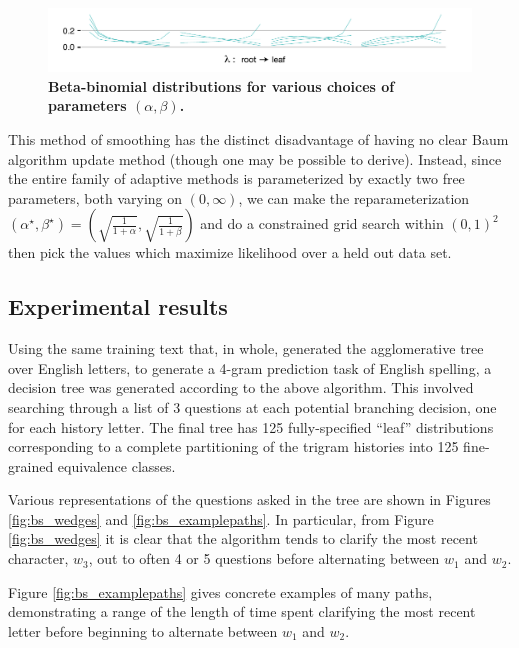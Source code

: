 \documentclass[12pt]{article}
\begin{document}
\begin{figure}
  \centering
  \includegraphics[width=\linewidth]{betabinom}
  \caption{\textbf{Beta-binomial distributions for various choices of
      parameters $(\alpha, \beta)$.}}
  \label{fig:betabinomial}
\end{figure}

This method of smoothing has the distinct disadvantage of having no
clear Baum algorithm update method (though one may be possible to
derive). Instead, since the entire family of adaptive methods is
parameterized by exactly two free parameters, both varying on $(0,
\infty)$, we can make the reparameterization $(\alpha^\star,
\beta^\star) = \left(\sqrt{\frac{1}{1+\alpha}},
  \sqrt{\frac{1}{1+\beta}}\right)$ and do a constrained grid search
within $(0,1)^2$ then pick the values which maximize likelihood over a
held out data set.

\subsection{Experimental results}

Using the same training text that, in whole, generated the
agglomerative tree over English letters, to generate a 4-gram
prediction task of English spelling, a decision tree was generated
according to the above algorithm. This involved searching through a
list of 3 questions at each potential branching decision, one for each
history letter. The final tree has 125 fully-specified ``leaf''
distributions corresponding to a complete partitioning of the trigram
histories into 125 fine-grained equivalence classes.

Various representations of the questions asked in the tree are shown
in Figures \ref{fig:bs_wedges} and \ref{fig:bs_examplepaths}. In
particular, from Figure \ref{fig:bs_wedges} it is clear that the
algorithm tends to clarify the most recent character, $w_3$, out to
often 4 or 5 questions before alternating between $w_1$ and $w_2$.

Figure \ref{fig:bs_examplepaths} gives concrete examples of many
paths, demonstrating a range of the length of time spent clarifying
the most recent letter before beginning to alternate between $w_1$ and
$w_2$.

\end{document}

